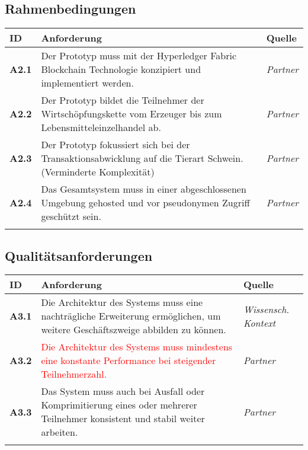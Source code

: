 \subsection{Rahmenbedingungen} \label{tab:functional-requirements}
\begin{table}[H]
    \begin{tabularx}{\textwidth}{@{}lXp{2cm}@{}}
        \toprule
        ID                & Anforderung & Quelle \\
        \midrule
        \textbf{A2.1}              & Der Prototyp muss mit der Hyperledger Fabric Blockchain Technologie konzipiert und implementiert werden.                     & \textit{Partner}                \\ \addlinespace
        \textbf{A2.2}              & Der Prototyp bildet die Teilnehmer der Wirtschöpfungskette vom Erzeuger bis zum Lebensmitteleinzelhandel ab.                     & \textit{Partner}                \\ \addlinespace
        \textbf{A2.3}              & Der Prototyp fokussiert sich bei der Transaktionsabwicklung auf die Tierart Schwein. (Verminderte Komplexität)                     & \textit{Partner}                \\ \addlinespace
        \textbf{A2.4}\label{req:A2.4}              & Das Gesamtsystem muss in einer abgeschlossenen Umgebung gehosted und vor pseudonymen Zugriff geschützt sein.                     & \textit{Partner}                \\ \addlinespace
        \bottomrule
    \end{tabularx}
\end{table}

\subsection{Qualitätsanforderungen} \label{tab:functional-requirements}
\begin{table}[H]
    \begin{tabularx}{\textwidth}{@{}lXp{2cm}@{}}
        \toprule
        ID                & Anforderung & Quelle \\
        \midrule
        \textbf{A3.1}              & Die Architektur des Systems muss eine nachträgliche Erweiterung ermöglichen, um weitere Geschäftszweige abbilden zu können.                     & \textit{Wissensch. Kontext}                \\ \addlinespace
        \textbf{A3.2}              & \textcolor{red}{Die Architektur des Systems muss mindestens eine konstante Performance bei steigender Teilnehmerzahl.}                     & \textit{Partner}                \\ \addlinespace
        \textbf{A3.3}              & Das System muss auch bei Ausfall oder Komprimitierung eines oder mehrerer Teilnehmer konsistent und stabil weiter arbeiten.                    & \textit{Partner}                \\ \addlinespace
        \bottomrule
    \end{tabularx}
\end{table}

